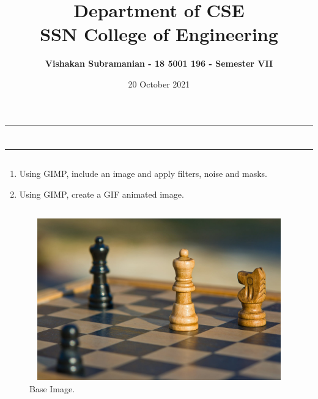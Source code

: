 \documentclass[12pt, a4]{article}
\title{\textbf{Department of CSE\\SSN College of Engineering}}
\author{\textbf{Vishakan Subramanian - 18 5001 196 - Semester VII}}
\date{20 October 2021}
\begin{document}
\maketitle
\hrule
\section*{}
\hrule
\bigskip

\subsection*{}
\subsection*{}
\begin{flushleft}

\begin{enumerate}

\item Using GIMP, include an image and apply filters, noise and masks.
\item Using GIMP, create a GIF animated image. 

\end{enumerate}
 
\end{flushleft}


\newpage
\subsection*{}
\begin{figure}[h]
\centering
\caption{Base Image.}
\includegraphics[height=7cm, width=12cm]{Chess.jpeg}
\end{figure}
\end{document}
